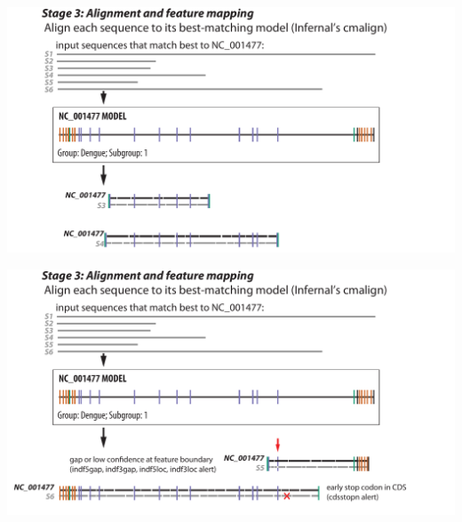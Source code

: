 \documentclass[landscape]{slides}
\begin{document}
\begin{slide}
\begin{center}

\includegraphics[width=10.5in]{figs/v-annotate-stage3-2}
\end{center}

\vfill
\end{slide}
\begin{slide}
\begin{center}

\includegraphics[width=10.5in]{figs/v-annotate-stage3-3}
\end{center}

\vfill
\end{slide}
\end{document}
